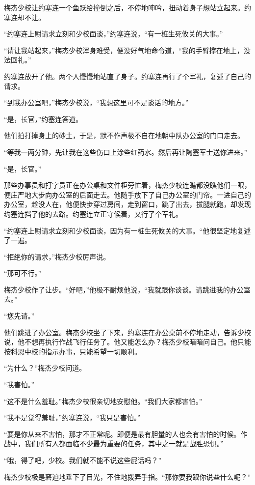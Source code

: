    梅杰少校让约塞连一个鱼跃给撞倒之后，不停地呻吟，扭动着身子想站立起来。约塞连却不让。

    “约塞连上尉请求立刻和少校面谈，”约塞连说，“有一桩生死攸关的大事。”

    “请让我站起来，”梅杰少校浑身难受，便没好气地命令道，“我的手臂撑在地上，没法回礼。”

    约塞连放开了他。两个人慢慢地站直了身子。约塞连再行了个军礼，复述了自己的请求。

    “到我办公室吧，”梅杰少校说，“我想这里可不是谈话的地方。”

    “是，长官，”约塞连答道。

    他们拍打掉身上的砂土，于是，默不作声极不自在地朝中队办公室的门口走去。

    “等我一两分钟，先让我在这些伤口上涂些红药水。然后再让陶塞军士送你进来。”

    “是，长官。”

    那些办事员和打字员正在办公桌和文件柜旁忙着，梅杰少校连瞧都没瞧他们一眼，便庄严地大步向办公室的后面走去。他随手放下了自己办公室的门帘。一进自己的办公室，趁没人在，他便快步穿过房间，走到窗口，跳了出去，拔腿就跑，却发现约塞连挡了他的去路。约塞连立正守候着，又行了个军礼。

    “约塞连上尉请求立刻和少校面谈，因为有一桩生死攸关的大事。“他很坚定地复述了一遍。

    “拒绝你的请求，”梅杰少校厉声说。

    “那可不行。”

    梅杰少校作了让步。“好吧，”他极不耐烦他说，“我就跟你谈谈。请跳进我的办公室去。”

    “您先请。”

    他们跳进了办公室。梅杰少校坐了下来，约塞连在办公桌前不停地走动，告诉少校说，他不想再执行作战飞行任务了。他又能怎么办？梅杰少校暗暗问自己。他只能按科恩中校的指示办事，只能希望一切顺利。

    “为什么？”梅杰少校问道。

    “我害怕。”

    “这不是什么羞耻。”梅杰少校很亲切地安慰他。“我们大家都害怕。”

    “我不是觉得羞耻，”约塞连说，“我只是害怕。”

    “要是你从来不害怕，那才不正常呢。即便是最有胆量的人也会有害怕的时候。作战中，我们所有人都面临不少最为重要的任务，其中之一就是战胜恐惧。”

    “哦，得了吧，少校。我们就不能不说这些屁话吗？”

    梅杰少校极是窘迫地垂下了目光，不住地拨弄手指。“那你要我跟你说些什么呢？”

